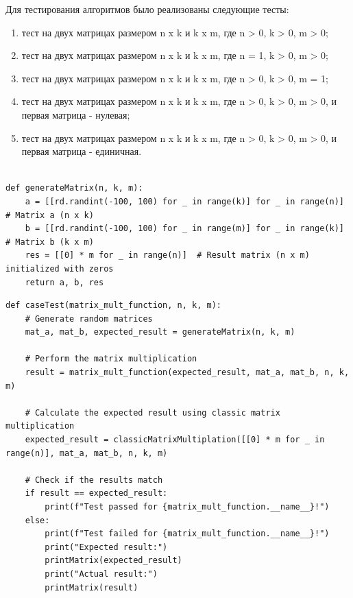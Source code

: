 Для тестирования алгоритмов было реализованы следующие тесты:
\begin{enumerate}
	\item тест на двух матрицах размером n x k и k x m, где n > 0, k >  0, m > 0;
	\item тест на двух матрицах размером n x k и k x m, где n = 1, k >  0, m > 0;
	\item тест на двух матрицах размером n x k и k x m, где n > 0, k >  0, m = 1;
	\item тест на двух матрицах размером n x k и k x m, где n > 0, k >  0, m > 0, и первая матрица - нулевая;
	\item тест на двух матрицах размером n x k и k x m, где n > 0, k >  0, m > 0, и первая матрица - единичная.
\end{enumerate}

\begin{lstlisting}[label=some-code-5,caption=Реализация функции рандомной генерации матриц]

def generateMatrix(n, k, m):
    a = [[rd.randint(-100, 100) for _ in range(k)] for _ in range(n)]  # Matrix a (n x k)
    b = [[rd.randint(-100, 100) for _ in range(m)] for _ in range(k)]  # Matrix b (k x m)
    res = [[0] * m for _ in range(n)]  # Result matrix (n x m) initialized with zeros
    return a, b, res

\end{lstlisting}

\begin{lstlisting}[label=some-code-6,caption=Реализация общей функции тестирования]
def caseTest(matrix_mult_function, n, k, m):
    # Generate random matrices
    mat_a, mat_b, expected_result = generateMatrix(n, k, m)

    # Perform the matrix multiplication
    result = matrix_mult_function(expected_result, mat_a, mat_b, n, k, m)

    # Calculate the expected result using classic matrix multiplication
    expected_result = classicMatrixMultiplation([[0] * m for _ in range(n)], mat_a, mat_b, n, k, m)

    # Check if the results match
    if result == expected_result:
        print(f"Test passed for {matrix_mult_function.__name__}!")
    else:
        print(f"Test failed for {matrix_mult_function.__name__}!")
        print("Expected result:")
        printMatrix(expected_result)
        print("Actual result:")
        printMatrix(result)

\end{lstlisting}

